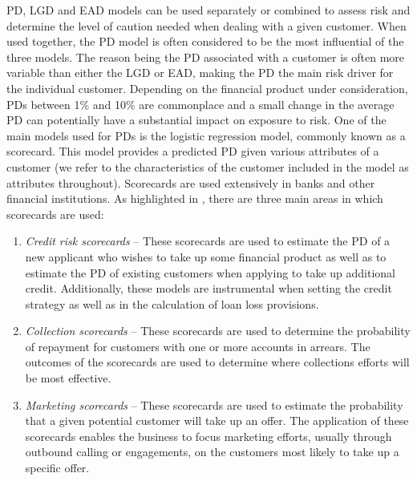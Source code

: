 \documentclass{article}
\theoremstyle{def}
\begin{document}
PD, LGD and EAD models can be used separately or combined to assess risk and determine the level of caution needed when dealing with a given customer. When used together, the PD model is often considered to be the most influential of the three models. The reason being the PD associated with a customer is often more variable than either the LGD or EAD, making the PD the main risk driver for the individual customer. Depending on the financial product under consideration, PDs between 1\% and 10\% are commonplace and a small change in the average PD can potentially have a substantial impact on exposure to risk. One of the main models used for PDs is the logistic regression model, commonly known as a scorecard.
This model provides a predicted PD given various attributes of a customer (we refer to the characteristics of the customer included in the model as attributes throughout). Scorecards are used extensively in banks and other financial institutions. As highlighted in \cite{DUPISANIEVISAGIE2020}, there are three main areas in which scorecards are used:
\begin{enumerate}
\item \emph{Credit risk scorecards} – These scorecards are used to estimate the PD of a new applicant who wishes to take up some financial product as well as to estimate the PD of existing customers when applying to take up additional credit. Additionally, these models are instrumental when setting the credit strategy as well as in the calculation of loan loss provisions.
\item \emph{Collection scorecards} – These scorecards are used to determine the probability of repayment for customers with one or more accounts in arrears. The outcomes of the scorecards are used to determine where collections efforts will be most effective.
\item \emph{Marketing scorecards} – These scorecards are used to estimate the probability that a given potential customer will take up an offer. The application of these scorecards enables the business to focus marketing efforts, usually through outbound calling or engagements, on the customers most likely to take up a specific offer.
\end{enumerate}
\end{document}
